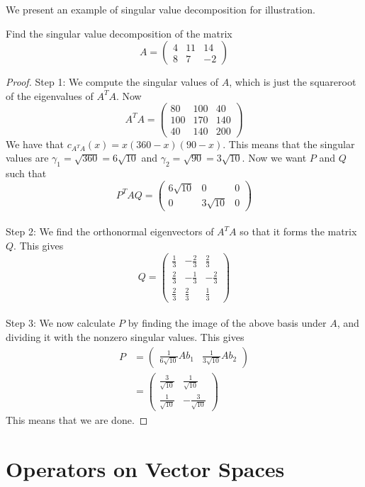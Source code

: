 \documentclass[a4paper]{article}
\begin{document}
We present an example of singular value decomposition for illustration. 

\begin{eg}{}{} Find the singular value decomposition of the matrix $$A=\begin{pmatrix}
4 & 11 & 14\\
8 & 7 & -2
\end{pmatrix}$$ \tcbline
\begin{proof}
Step 1: We compute the singular values of $A$, which is just the squareroot of the eigenvalues of $A^TA$. Now 
$$A^TA=\begin{pmatrix}
80 & 100 & 40\\
100 & 170 & 140\\
40 & 140 & 200
\end{pmatrix}$$
We have that $c_{A^TA}(x)=x(360-x)(90-x)$. This means that the singular values are $\gamma_1=\sqrt{360}=6\sqrt{10}$ and $\gamma_2=\sqrt{90}=3\sqrt{10}$. Now we want $P$ and $Q$ such that $$P^TAQ=\begin{pmatrix}
6\sqrt{10} & 0 & 0\\
0 & 3\sqrt{10} & 0
\end{pmatrix}$$~\\
Step 2: We find the orthonormal eigenvectors of $A^TA$ so that it forms the matrix $Q$. This gives $$Q=\begin{pmatrix}
\frac{1}{3} & -\frac{2}{3} & \frac{2}{3}\\
\frac{2}{3} & -\frac{1}{3} & -\frac{2}{3}\\
\frac{2}{3} & \frac{2}{3} & \frac{1}{3}
\end{pmatrix}$$~\\
Step 3: We now calculate $P$ by finding the image of the above basis under $A$, and dividing it with the nonzero singular values. This gives 
\begin{align*}
P&=\begin{pmatrix}
\frac{1}{6\sqrt{10}}Ab_1 & \frac{1}{3\sqrt{10}}Ab_2
\end{pmatrix}\\
&=\begin{pmatrix}
\frac{3}{\sqrt{10}} & \frac{1}{\sqrt{10}}\\
\frac{1}{\sqrt{10}} & -\frac{3}{\sqrt{10}}
\end{pmatrix}
\end{align*}
This means that we are done. 
\end{proof}
\end{eg}

\pagebreak
\section{Operators on Vector Spaces}
\end{document}

